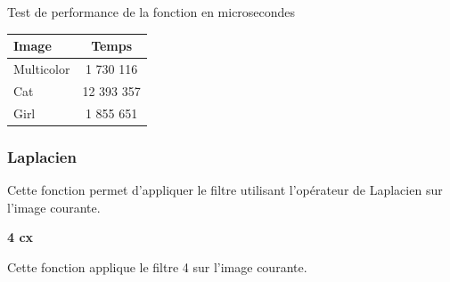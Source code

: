\documentclass{article}
\begin{document}
\begin{center}
\medbreak
Test de performance de la fonction en microsecondes
\bigbreak
   \begin{tabular}{ | l | c | }
     \hline
     Image & Temps \\
     \hline
     Multicolor & 1 730 116 \\
     \hline
     Cat & 12 393 357 \\
     \hline
     Girl & 1 855 651 \\
     \hline
   \end{tabular}
 \end{center}
\bigbreak

\subsubsection{Laplacien}

Cette fonction permet d'appliquer le filtre utilisant l'opérateur de Laplacien sur l'image courante.

\textbf{4 cx}

Cette fonction applique le filtre 4 sur l'image courante.
\end{document}
